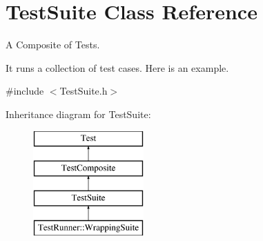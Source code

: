 \hypertarget{class_test_suite}{\section{Test\-Suite Class Reference}
\label{class_test_suite}
}


A Composite of Tests.

It runs a collection of test cases. Here is an example.  




{\ttfamily \#include $<$Test\-Suite.\-h$>$}

Inheritance diagram for Test\-Suite\-:\begin{figure}[H]
\begin{center}
\leavevmode
\includegraphics[height=4.000000cm]{class_test_suite}
\end{center}
\end{figure}
